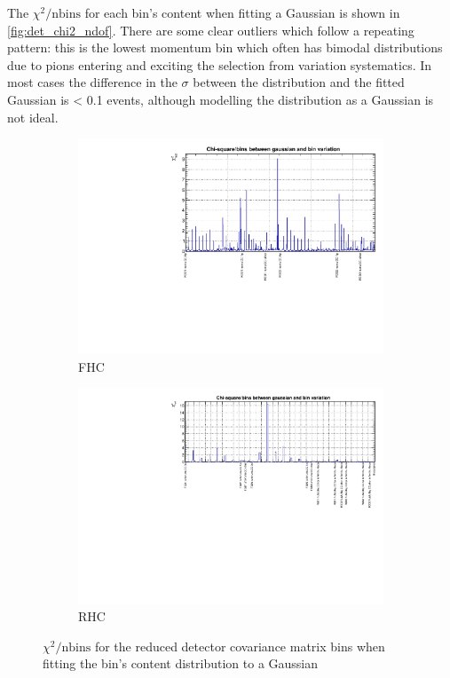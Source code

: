 The $\chi^2/\text{nbins}$ for each bin's content when fitting a Gaussian is shown in \autoref{fig:det_chi2_ndof}. There are some clear outliers which follow a repeating pattern: this is the lowest momentum bin which often has bimodal distributions due to pions entering and exciting the selection from variation systematics. In most cases the difference in the $\sigma$ between the distribution and the fitted Gaussian is < 0.1 events, although modelling the distribution as a Gaussian is not ideal.
\begin{figure}[h]
	\begin{subfigure}[t]{0.7\textwidth}
		\includegraphics[width=\textwidth,page=1, trim={0mm 0mm 0mm 0mm}, clip]{figures/det/fhc_v7_chi2ndof}
		\caption{FHC}
	\end{subfigure}

	\begin{subfigure}[t]{0.7\textwidth}
		\includegraphics[width=\textwidth,page=1, trim={0mm 0mm 0mm 0mm}, clip]{figures/det/rhc_v7_chi2ndof}
		\caption{RHC}
	\end{subfigure}
\caption{$\chi^2/\text{nbins}$ for the reduced detector covariance matrix bins when fitting the bin's content distribution to a Gaussian}
\label{fig:det_chi2_ndof}
\end{figure}

